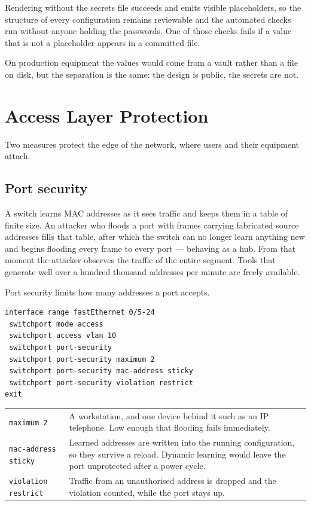 \documentclass[12pt,a4paper]{article}
\begin{document}
Rendering without the secrets file succeeds and emits visible placeholders, so
the structure of every configuration remains reviewable and the automated
checks run without anyone holding the passwords. One of those checks fails if a
value that is not a placeholder appears in a committed file.

On production equipment the values would come from a vault rather than a file
on disk, but the separation is the same: the design is public, the secrets are
not.

\newpage
\section{Access Layer Protection}

Two measures protect the edge of the network, where users and their equipment
attach.

\subsection{Port security}

A switch learns MAC addresses as it sees traffic and keeps them in a table of
finite size. An attacker who floods a port with frames carrying fabricated
source addresses fills that table, after which the switch can no longer learn
anything new and begins flooding every frame to every port --- behaving as a
hub. From that moment the attacker observes the traffic of the entire segment.
Tools that generate well over a hundred thousand addresses per minute are
freely available.

Port security limits how many addresses a port accepts.

\begin{lstlisting}
interface range fastEthernet 0/5-24
 switchport mode access
 switchport access vlan 10
 switchport port-security
 switchport port-security maximum 2
 switchport port-security mac-address sticky
 switchport port-security violation restrict
exit
\end{lstlisting}

\begin{table}[H]
\centering
\begin{tabular}{@{} l p{9cm} @{}}
\toprule
\texttt{maximum 2} & A workstation, and one device behind it such as an IP
  telephone. Low enough that flooding fails immediately. \\
\texttt{mac-address sticky} & Learned addresses are written into the running
  configuration, so they survive a reload. Dynamic learning would leave the
  port unprotected after a power cycle. \\
\texttt{violation restrict} & Traffic from an unauthorised address is dropped
  and the violation counted, while the port stays up. \\
\bottomrule
\end{tabular}
\end{table}
\end{document}
